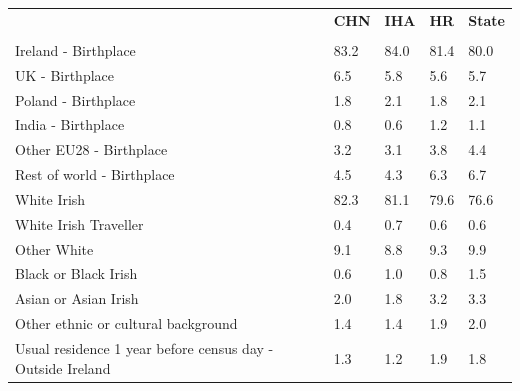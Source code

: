 \documentclass{article}
\begin{document}
\pagebreak
\begin{table}[h]	
\centering
		\begin{tabular}{KTTTT}
  \hline
& \textbf{CHN} & \textbf{IHA} & \textbf{HR}& \textbf{State}\\ 
  \hline
    \\ 
    \hline
Ireland - Birthplace & 83.2& 84.0& 81.4& 80.0\\
UK - Birthplace & 6.5& 5.8& 5.6& 5.7\\
Poland - Birthplace & 1.8& 2.1& 1.8& 2.1\\
India - Birthplace & 0.8& 0.6& 1.2& 1.1\\
Other EU28 - Birthplace & 3.2& 3.1& 3.8& 4.4\\
Rest of world - Birthplace & 4.5& 4.3& 6.3& 6.7\\
    \hline
White Irish & 82.3& 81.1& 79.6& 76.6\\
White Irish Traveller & 0.4& 0.7& 0.6& 0.6\\
Other White & 9.1& 8.8& 9.3& 9.9\\
Black or Black Irish & 0.6& 1.0& 0.8& 1.5\\
Asian or Asian Irish & 2.0& 1.8& 3.2& 3.3\\
Other ethnic or cultural background & 1.4& 1.4& 1.9& 2.0\\
    \hline
Usual residence 1 year before census day - Outside Ireland & 1.3& 1.2& 1.9& 1.8\\


\end{tabular}
\end{table}
\end{document}
